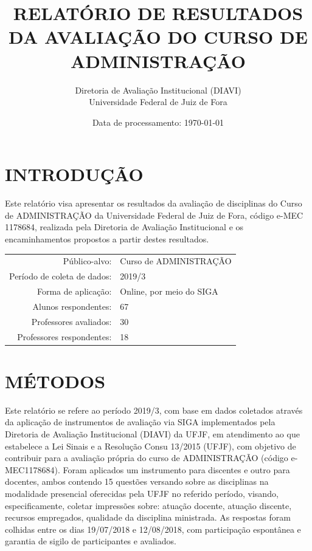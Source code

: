 \documentclass[a4paper,10pt]{article}
\date{Data de processamento: \today}
\begin{document}
\author{Diretoria de Avaliação Institucional (DIAVI) \\ Universidade Federal de Juiz de Fora}

\title{RELATÓRIO DE RESULTADOS DA AVALIAÇÃO DO CURSO DE ADMINISTRAÇÃO}
\maketitle
\section{INTRODUÇÃO}
Este relatório visa apresentar os resultados da avaliação de disciplinas do Curso     de ADMINISTRAÇÃO da Universidade Federal de Juiz de Fora, código e-MEC 1178684, realizada pela     Diretoria de Avaliação Institucional e os encaminhamentos propostos a     partir destes resultados.

\begin{center}
\begin{tabularx}{\linewidth}{r|X}

Público-alvo:& Curso de ADMINISTRAÇÃO\\

Período de coleta de dados:& 2019/3 \\

Forma de aplicação:& Online, por meio do SIGA\\

Alunos respondentes:& 67\\

Professores avaliados:& 30\\

Professores respondentes:& 18\\
\end{tabularx}
\end{center}

\section{MÉTODOS}
Este relatório se refere ao período 2019/3, com base em dados     coletados através da aplicação de instrumentos de avaliação via SIGA     implementados pela Diretoria de Avaliação Institucional (DIAVI) da UFJF, em atendimento     ao que estabelece a Lei Sinais e a Resolução Consu 13/2015 (UFJF),     com objetivo de contribuir para a avaliação própria do curso de ADMINISTRAÇÃO (código e-MEC1178684). Foram aplicados um instrumento para discentes e outro para docentes, ambos contendo     15 questões versando sobre as disciplinas na modalidade presencial oferecidas pela UFJF no     referido período, visando, especificamente, coletar impressões sobre: atuação docente, atuação discente,     recursos empregados, qualidade da disciplina ministrada.     As respostas foram colhidas entre os dias 19/07/2018 e 12/08/2018, com participação espontânea e garantia de    sigilo de participantes e avaliados.
\end{document}
